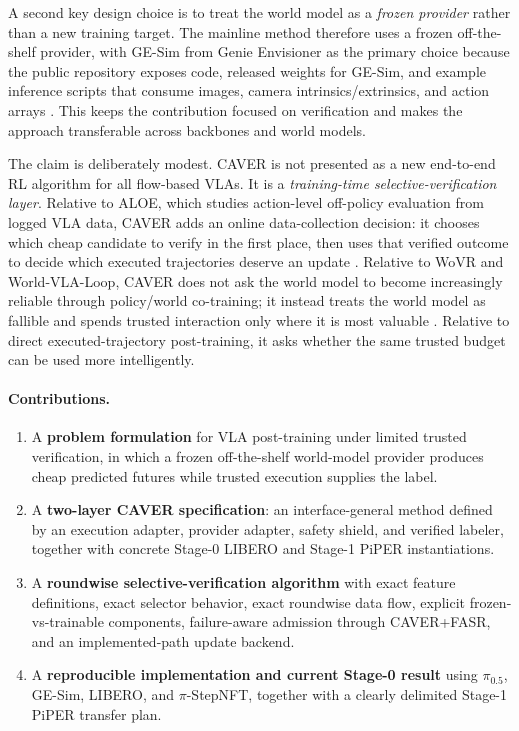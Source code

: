 \documentclass[10pt]{article}
\theoremstyle{plain}
\theoremstyle{definition}
\theoremstyle{remark}
\begin{document}
A second key design choice is to treat the world model as a \emph{frozen provider} rather than a new training target. The mainline method therefore uses a frozen off-the-shelf provider, with GE-Sim from Genie Envisioner as the primary choice because the public repository exposes code, released weights for GE-Sim, and example inference scripts that consume images, camera intrinsics/extrinsics, and action arrays \citep{liao2025genie,genierepo2026}. This keeps the contribution focused on verification and makes the approach transferable across backbones and world models.

The claim is deliberately modest. CAVER is not presented as a new end-to-end RL algorithm for all flow-based VLAs. It is a \emph{training-time selective-verification layer}. Relative to ALOE, which studies action-level off-policy evaluation from logged VLA data, CAVER adds an online data-collection decision: it chooses which cheap candidate to verify in the first place, then uses that verified outcome to decide which executed trajectories deserve an update \citep{yang2026aloe}. Relative to WoVR and World-VLA-Loop, CAVER does not ask the world model to become increasingly reliable through policy/world co-training; it instead treats the world model as fallible and spends trusted interaction only where it is most valuable \citep{jiang2026wovr,liu2026worldvlaloop}. Relative to direct executed-trajectory post-training, it asks whether the same trusted budget can be used more intelligently.

\paragraph{Contributions.}
\begin{enumerate}
    \item A \textbf{problem formulation} for VLA post-training under limited trusted verification, in which a frozen off-the-shelf world-model provider produces cheap predicted futures while trusted execution supplies the label.
    \item A \textbf{two-layer CAVER specification}: an interface-general method defined by an execution adapter, provider adapter, safety shield, and verified labeler, together with concrete Stage-0 LIBERO and Stage-1 PiPER instantiations.
    \item A \textbf{roundwise selective-verification algorithm} with exact feature definitions, exact selector behavior, exact roundwise data flow, explicit frozen-vs-trainable components, failure-aware admission through CAVER+FASR, and an implemented-path update backend.
    \item A \textbf{reproducible implementation and current Stage-0 result} using $\pi_{0.5}$, GE-Sim, LIBERO, and $\pi$-StepNFT, together with a clearly delimited Stage-1 PiPER transfer plan.
\end{enumerate}
\end{document}
